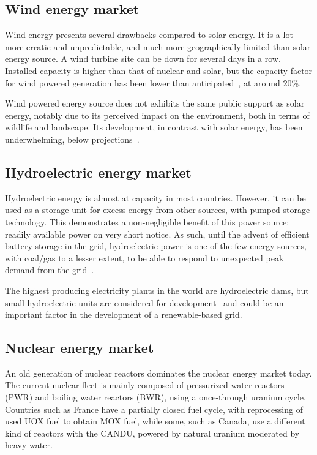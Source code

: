 \documentclass[IJPHM, 2017, 29]{PHMSociety}
\begin{document}
\subsection{Wind energy market}

Wind energy presents several drawbacks compared to solar energy. It is a lot more erratic and unpredictable, and much more geographically limited than solar energy source. A wind turbine site can be down for several days in a row. Installed capacity is higher than that of nuclear and solar, but the capacity factor for wind powered generation has been lower than anticipated~\citep{wind_cf}, at around 20\%.

Wind powered energy source does not exhibits the same public support as solar energy, notably due to its perceived impact on the environment, both in terms of wildlife and landscape. Its development, in contrast with solar energy, has been underwhelming, below projections~\citep{wind_perf}.


\subsection{Hydroelectric energy market}

Hydroelectric energy is almost at capacity in most countries. However, it can be used as a storage unit for excess energy from other sources, with pumped storage technology. This demonstrates a non-negligible benefit of this power source: readily available power on very short notice. As such, until the advent of efficient battery storage in the grid, hydroelectric power is one of the few energy sources, with coal/gas to a lesser extent, to be able to respond to unexpected peak demand from the grid~\citep{bueno2005technical}. 

The highest producing electricity plants in the world are hydroelectric dams, but small hydroelectric units are considered for development~\citep{hydro_small} and could be an important factor in the development of a renewable-based grid.

\subsection{Nuclear energy market}

An old generation of nuclear reactors dominates the nuclear energy market today. The current nuclear fleet is mainly composed of pressurized water reactors (PWR) and boiling water reactors (BWR), using a once-through uranium cycle. Countries such as France have a partially closed fuel cycle, with reprocessing of used UOX fuel to obtain MOX fuel, while some, such as Canada, use a different kind of reactors with the CANDU, powered by natural uranium moderated by heavy water.
\end{document}
